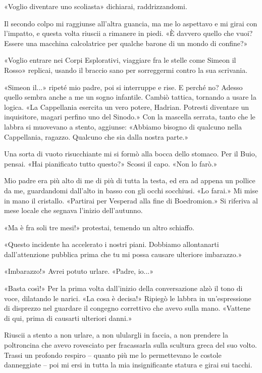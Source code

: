 «Voglio diventare uno scoliasta» dichiarai, raddrizzandomi.

Il secondo colpo mi raggiunse all'altra guancia, ma me lo aspettavo e mi
girai con l'impatto, e questa volta riuscii a rimanere in piedi. «È
davvero quello che vuoi? Essere una macchina calcolatrice per qualche
barone di un mondo di confine?»

«Voglio entrare nei Corpi Esplorativi, viaggiare fra le stelle come
Simeon il Rosso» replicai, usando il braccio sano per sorreggermi contro
la sua scrivania.

«Simeon il...» ripeté mio padre, poi si interruppe e rise. E perché no?
Adesso quello sembra anche a me un sogno infantile. Cambiò tattica,
tornando a usare la logica. «La Cappellania esercita un vero potere,
Hadrian. Potresti diventare un inquisitore, magari perfino uno del
Sinodo.» Con la mascella serrata, tanto che le labbra si muovevano a
stento, aggiunse: «Abbiamo bisogno di qualcuno nella Cappellania,
ragazzo. Qualcuno che sia dalla nostra parte.»

Una sorta di vuoto risucchiante mi si formò alla bocca dello stomaco.
Per il Buio, pensai. «Hai pianificato tutto questo?» Scossi il capo.
«Non lo farò.»

Mio padre era più alto di me di più di tutta la testa, ed era ad appena
un pollice da me, guardandomi dall'alto in basso con gli occhi
socchiusi. «Lo farai.» Mi mise in mano il cristallo. «Partirai per
Vesperad alla fine di Boedromion.» Si riferiva al mese locale che
segnava l'inizio dell'autunno.

«Ma è fra soli tre mesi!» protestai, temendo un altro schiaffo.

«Questo incidente ha accelerato i nostri piani. Dobbiamo allontanarti
dall'attenzione pubblica prima che tu mi possa causare ulteriore
imbarazzo.»

«Imbarazzo!» Avrei potuto urlare. «Padre, io...»

«Basta così!» Per la prima volta dall'inizio della conversazione alzò il
tono di voce, dilatando le narici. «La cosa è decisa!» Ripiegò le labbra
in un'espressione di disprezzo nel guardare il congegno correttivo che
avevo sulla mano. «Vattene di qui, prima di causarti ulteriori danni.»

Riuscii a stento a non urlare, a non ululargli in faccia, a non prendere
la poltroncina che avevo rovesciato per fracassarla sulla scultura greca
del suo volto. Trassi un profondo respiro -- quanto più me lo
permettevano le costole danneggiate -- poi mi ersi in tutta la mia
insignificante statura e girai sui tacchi.

